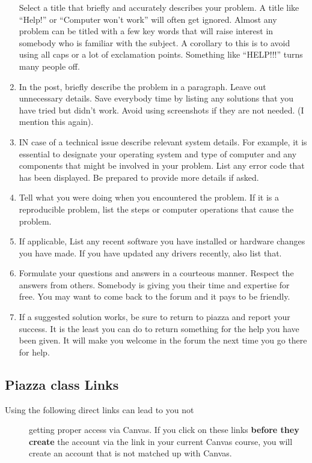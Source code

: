 \begin{enumerate}
  Select a title that briefly and accurately describes your problem. A
  title like ``Help!'' or ``Computer won't work'' will often get
  ignored. Almost any problem can be titled with a few key words that
  will raise interest in somebody who is familiar with the subject. A
  corollary to this is to avoid using all caps or a lot of exclamation
  points. Something like ``HELP!!!'' turns many people off.
\item
  In the post, briefly describe the problem in a paragraph. Leave out
  unnecessary details. Save everybody time by listing any solutions that
  you have tried but didn't work. Avoid using screenshots if they are
  not needed. (I mention this again).
\item
  IN case of a technical issue describe relevant system details. For
  example, it is essential to designate your operating system and type
  of computer and any components that might be involved in your problem.
  List any error code that has been displayed. Be prepared to provide
  more details if asked.
\item
  Tell what you were doing when you encountered the problem. If it is a
  reproducible problem, list the steps or computer operations that cause
  the problem.
\item
  If applicable, List any recent software you have installed or hardware
  changes you have made. If you have updated any drivers recently, also
  list that.
\item
  Formulate your questions and answers in a courteous manner. Respect
  the answers from others. Somebody is giving you their time and
  expertise for free. You may want to come back to the forum and it pays
  to be friendly.
\item
  If a suggested solution works, be sure to return to piazza and report
  your success. It is the least you can do to return something for the
  help you have been given. It will make you welcome in the forum the
  next time you go there for help.
\end{enumerate}

\subsection{Piazza class Links}\label{piazza-class-links}

\begin{description}
\item[Using the following direct links can lead to you not]
getting proper access via Canvas. If you click on these links
\textbf{before they create} the account via the link in your current
Canvas course, you will create an account that is not matched up with
Canvas.
\end{description}

